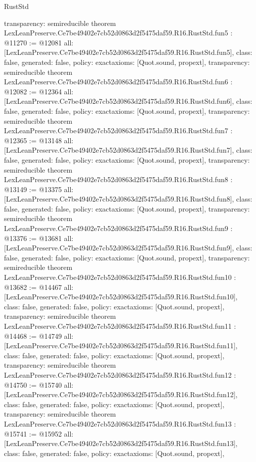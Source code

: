 \begin{lexlean}{RustStd}
\begin{coremodule}
{  transparency: semireducible
}
theorem LexLeanPreserve.Ce7be49402e7cb52d0863d2f5475daf59.R16.RustStd.fun5 : @11270 := @12081 {
  all: [LexLeanPreserve.Ce7be49402e7cb52d0863d2f5475daf59.R16.RustStd.fun5],
  class: false,
  generated: false,
  policy: exact{axioms: [Quot.sound, propext]},
  transparency: semireducible
}
theorem LexLeanPreserve.Ce7be49402e7cb52d0863d2f5475daf59.R16.RustStd.fun6 : @12082 := @12364 {
  all: [LexLeanPreserve.Ce7be49402e7cb52d0863d2f5475daf59.R16.RustStd.fun6],
  class: false,
  generated: false,
  policy: exact{axioms: [Quot.sound, propext]},
  transparency: semireducible
}
theorem LexLeanPreserve.Ce7be49402e7cb52d0863d2f5475daf59.R16.RustStd.fun7 : @12365 := @13148 {
  all: [LexLeanPreserve.Ce7be49402e7cb52d0863d2f5475daf59.R16.RustStd.fun7],
  class: false,
  generated: false,
  policy: exact{axioms: [Quot.sound, propext]},
  transparency: semireducible
}
theorem LexLeanPreserve.Ce7be49402e7cb52d0863d2f5475daf59.R16.RustStd.fun8 : @13149 := @13375 {
  all: [LexLeanPreserve.Ce7be49402e7cb52d0863d2f5475daf59.R16.RustStd.fun8],
  class: false,
  generated: false,
  policy: exact{axioms: [Quot.sound, propext]},
  transparency: semireducible
}
theorem LexLeanPreserve.Ce7be49402e7cb52d0863d2f5475daf59.R16.RustStd.fun9 : @13376 := @13681 {
  all: [LexLeanPreserve.Ce7be49402e7cb52d0863d2f5475daf59.R16.RustStd.fun9],
  class: false,
  generated: false,
  policy: exact{axioms: [Quot.sound, propext]},
  transparency: semireducible
}
theorem LexLeanPreserve.Ce7be49402e7cb52d0863d2f5475daf59.R16.RustStd.fun10 : @13682 := @14467 {
  all: [LexLeanPreserve.Ce7be49402e7cb52d0863d2f5475daf59.R16.RustStd.fun10],
  class: false,
  generated: false,
  policy: exact{axioms: [Quot.sound, propext]},
  transparency: semireducible
}
theorem LexLeanPreserve.Ce7be49402e7cb52d0863d2f5475daf59.R16.RustStd.fun11 : @14468 := @14749 {
  all: [LexLeanPreserve.Ce7be49402e7cb52d0863d2f5475daf59.R16.RustStd.fun11],
  class: false,
  generated: false,
  policy: exact{axioms: [Quot.sound, propext]},
  transparency: semireducible
}
theorem LexLeanPreserve.Ce7be49402e7cb52d0863d2f5475daf59.R16.RustStd.fun12 : @14750 := @15740 {
  all: [LexLeanPreserve.Ce7be49402e7cb52d0863d2f5475daf59.R16.RustStd.fun12],
  class: false,
  generated: false,
  policy: exact{axioms: [Quot.sound, propext]},
  transparency: semireducible
}
theorem LexLeanPreserve.Ce7be49402e7cb52d0863d2f5475daf59.R16.RustStd.fun13 : @15741 := @15952 {
  all: [LexLeanPreserve.Ce7be49402e7cb52d0863d2f5475daf59.R16.RustStd.fun13],
  class: false,
  generated: false,
  policy: exact{axioms: [Quot.sound, propext]},
}
\end{coremodule}
\end{lexlean}
